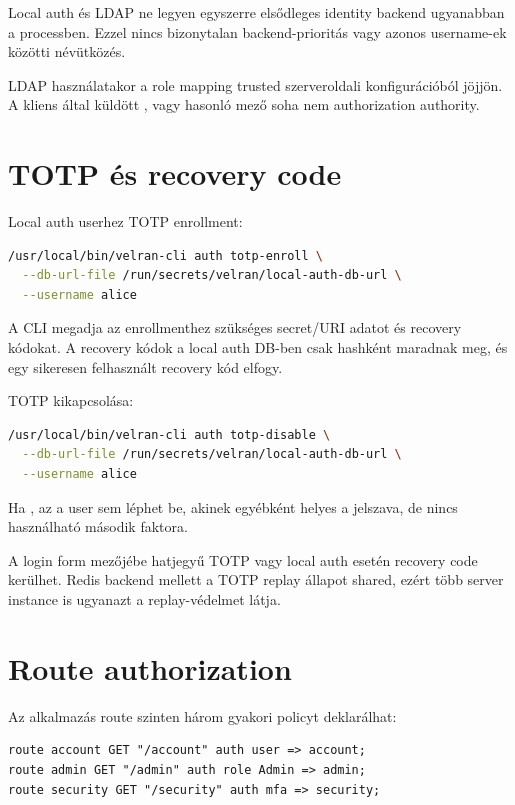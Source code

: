 Local auth és LDAP ne legyen egyszerre elsődleges identity backend ugyanabban a processben. Ezzel nincs bizonytalan backend-prioritás vagy azonos username-ek közötti névütközés.

LDAP használatakor a role mapping trusted szerveroldali konfigurációból jöjjön. A kliens által küldött ,  vagy hasonló mező soha nem authorization authority.

\section{TOTP és recovery code}

Local auth userhez TOTP enrollment:

\begin{lstlisting}[language=bash]
/usr/local/bin/velran-cli auth totp-enroll \
  --db-url-file /run/secrets/velran/local-auth-db-url \
  --username alice
\end{lstlisting}

A CLI megadja az enrollmenthez szükséges secret/URI adatot és recovery kódokat. A recovery kódok a local auth DB-ben csak hashként maradnak meg, és egy sikeresen felhasznált recovery kód elfogy.

TOTP kikapcsolása:

\begin{lstlisting}[language=bash]
/usr/local/bin/velran-cli auth totp-disable \
  --db-url-file /run/secrets/velran/local-auth-db-url \
  --username alice
\end{lstlisting}

Ha \code{require_totp = true}, az a user sem léphet be, akinek egyébként helyes a jelszava, de nincs használható második faktora.

A login form  mezőjébe hatjegyű TOTP vagy local auth esetén recovery code kerülhet. Redis backend mellett a TOTP replay állapot shared, ezért több server instance is ugyanazt a replay-védelmet látja.

\section{Route authorization}

Az alkalmazás route szinten három gyakori policyt deklarálhat:

\begin{lstlisting}[language=Velran]
route account GET "/account" auth user => account;
route admin GET "/admin" auth role Admin => admin;
route security GET "/security" auth mfa => security;
\end{lstlisting}

